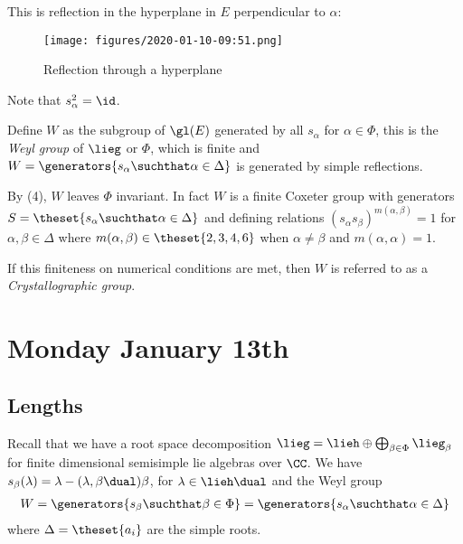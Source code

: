 This is reflection in the hyperplane in \(E\) perpendicular to
\(\alpha\):

\begin{figure}
\centering
\texttt{[image: figures/2020-01-10-09:51.png]}
\caption{Reflection through a hyperplane}
\end{figure}

Note that \(s_\alpha^2 = \id\).

\begin{definition}

Define \(W\) as the subgroup of \(\gl(E)\) generated by all \(s_\alpha\)
for \(\alpha \in \Phi\), this is the \emph{Weyl group} of \(\lieg\) or
\(\Phi\), which is finite and
\(W = \generators{s_\alpha \suchthat \alpha\in\Delta}\) is generated by
simple reflections.

\end{definition}

By (4), \(W\) leaves \(\Phi\) invariant. In fact \(W\) is a finite
Coxeter group with generators
\(S = \theset{s_\alpha \suchthat \alpha\in \Delta}\) and defining
relations \((s_\alpha s_\beta)^{m(\alpha, \beta)} = 1\) for
\(\alpha,\beta \in \Delta\) where
\(m(\alpha, \beta) \in \theset{2,3,4,6}\) when \(\alpha \neq \beta\) and
\(m(\alpha, \alpha) = 1\).

\begin{definition}

If this finiteness on numerical conditions are met, then \(W\) is
referred to as a \emph{Crystallographic group}.

\end{definition}

\hypertarget{monday-january-13th}{%
\section{Monday January 13th}\label{monday-january-13th}}

\hypertarget{lengths}{%
\subsection{Lengths}\label{lengths}}

Recall that we have a root space decomposition
\(\lieg = \lieh \oplus \bigoplus_{\beta \in \Phi} \lieg_\beta\) for
finite dimensional semisimple lie algebras over \(\CC\). We have
\(s_\beta(\lambda) = \lambda - (\lambda, \beta\dual)\beta\), for
\(\lambda \in \lieh\dual\) and the Weyl group
\begin{align*}
W = \generators{s_\beta \suchthat \beta\in\Phi} = \generators{s_\alpha \suchthat \alpha \in \Delta}
\end{align*} where \(\Delta = \theset{a_i}\) are the simple roots.

